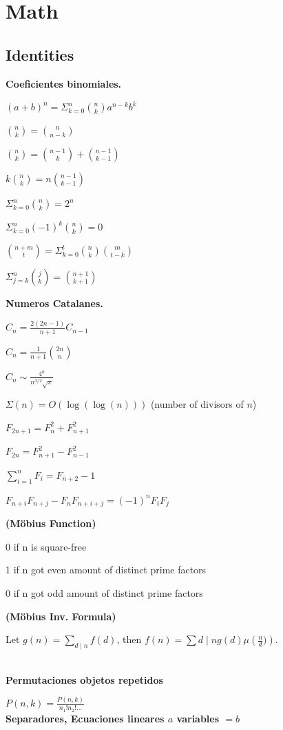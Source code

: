 \section{Math}
\subsection{Identities}
{
\textbf{Coeficientes binomiales.}

$(a+b)^{n} = \Sigma_{k = 0}^{n} \binom{n}{k}a^{n-k}b^{k}$

$\binom{n}{k} = \binom{n}{n-k}$

$\binom{n}{k} = \binom{n-1}{k} + \binom{n-1}{k-1}$

$k\binom{n}{k} = n\binom{n-1}{k-1}$

$\Sigma_{k = 0}^{n}\binom{n}{k} = 2^{n}$

$\Sigma_{k = 0}^{n} (-1)^{k}\binom{n}{k} = 0$

$\binom{n+m}{t} = \Sigma_{k = 0}^{t}\binom{n}{k}\binom{m}{t-k}$

$\Sigma_{j = k}^{n} \binom{j}{k} = \binom{n+1}{k+1}$

\textbf{Numeros Catalanes.}

$C_n = \frac{2(2n-1)}{n+1} C_{n-1}$

$C_n = \frac{1}{n+1} \binom{2n}{n}$

$C_n \sim \frac{4^n}{n^{3/2}\sqrt{\pi}}$

$\Sigma(n) = O(\log(\log(n)))$ (number of divisors of $n$)

$F_{2n+1} = F_{n}^2 + F_{n+1}^2$

$F_{2n} = F_{n+1}^2 - F_{n-1}^2$

$\sum_{i=1}^n F_i = F_{n+2}-1$

$F_{n+i}F_{n+j} - F_nF_{n+i+j} = (-1)^n F_iF_j$

\textbf{(Möbius Function)}

0 if n is square-free

1 if n got even amount of distinct prime factors

0 if n got odd amount of distinct prime factors

\textbf{(Möbius Inv. Formula)}

Let $g(n) = \sum_{d\mid n} f(d)$, then $f(n)=\sum{d\mid n} g(d) \mu\left(\frac{n}{d})\right)$.
}
\\
\textbf{Permutaciones objetos repetidos}

$P(n,k) = \frac{P(n,k)}{n_{1}!n_{2}!...}$ 
\\
\textbf{Separadores, Ecuaciones lineares $a$ variables $= b$}
  
